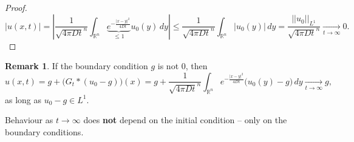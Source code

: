\documentclass[12pt]{article}
\theoremstyle{definition}
\newtheorem*{remark}{Remark}
\begin{document}
\begin{proof}
\[\big|u(x,t)\big|=\left|\frac1{\sqrt{4\pi Dt}^n}\int_{\mathbb R^n}\underbrace{e^{-\frac{|x-y|^2}{4Dt}}}_{\leq1}u_0(y)\,dy\right|\leq\frac1{\sqrt{4\pi Dt}^n}\int_{\mathbb R^n}\big|u_0(y)\big|\,dy=\frac{||u_0||_{L^1}}{\sqrt{4\pi Dt}^n}\xrightarrow[t\to\infty]{}0.\]
\end{proof}

\begin{remark}
If the boundary condition $g$ is not $0$, then
\[u(x,t)=g+\big(G_t*(u_0-g)\big)(x)=g+\frac1{\sqrt{4\pi Dt}^n}\int_{\mathbb R^n}e^{-\frac{|x-y|^2}{4Dt}}\big(u_0(y)-g\big)\,dy\xrightarrow[t\to\infty]{}g,\]
as long as $u_0-g\in L^1$.
\end{remark}

Behaviour as $t\to\infty$ does \textbf{not} depend on the initial condition -- only on the boundary conditions.
\end{document}
